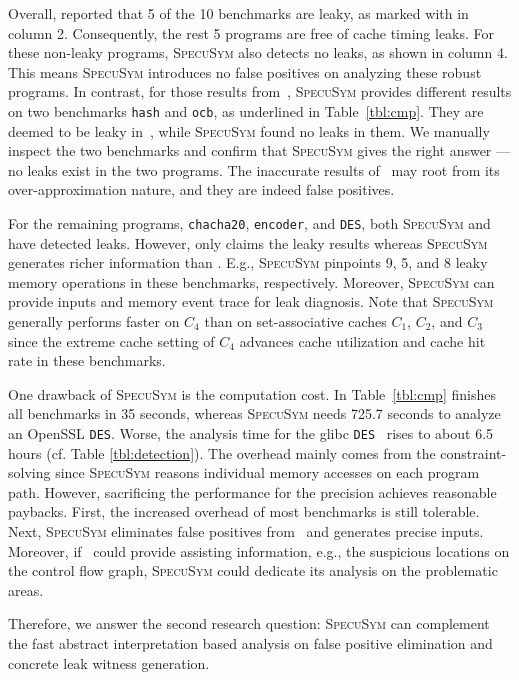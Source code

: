\documentclass[sigconf]{acmart}
\newcommand{\SpecuSym}{\textsc{SpecuSym} }
\begin{document}
Overall, \cite{WuW19} reported that 5 of the 10 benchmarks are leaky, as marked 
with  in column 2. Consequently, the rest 5 programs are free of cache
timing leaks. For these non-leaky programs, \SpecuSym also detects no leaks, as 
shown in column 4. This means \SpecuSym introduces no false positives on analyzing 
these robust programs. In contrast, for those  results from~\cite{WuW19}, 
\SpecuSym provides different results on two benchmarks \texttt{hash} and \texttt{ocb}, 
as underlined in Table~\ref{tbl:cmp}. They are deemed to be leaky in~\cite{WuW19},
while \SpecuSym found no leaks in them. We manually inspect the two benchmarks and 
confirm that \SpecuSym gives the right answer --- no leaks exist in the two programs. 
The inaccurate results of~\cite{WuW19} may root from its over-approximation nature,
and they are indeed false positives.


For the remaining programs, \texttt{chacha20}, \texttt{encoder}, and \texttt{DES}, 
both \SpecuSym and~\cite{WuW19} have detected leaks. However, \cite{WuW19} only 
claims the leaky results whereas \SpecuSym generates richer information than
\cite{WuW19}. E.g., \SpecuSym pinpoints 9, 5, and 8 leaky memory operations in these 
benchmarks, respectively. Moreover, \SpecuSym can provide inputs and memory event 
trace for leak diagnosis. Note that \SpecuSym generally performs faster on $C_4$ 
than on set-associative caches $C_1$, $C_2$, and $C_3$ since the extreme cache 
setting of $C_4$ advances cache utilization and cache hit rate in these benchmarks. 


One drawback of \SpecuSym is the computation cost. In Table~\ref{tbl:cmp}
\cite{WuW19} finishes all benchmarks in 35 seconds, whereas \SpecuSym needs 
725.7 seconds to analyze an OpenSSL \texttt{DES}. Worse, the analysis time 
for the glibc \texttt{DES}~\cite{glibc} rises to about 6.5 hours (cf. Table
\ref{tbl:detection}). The overhead mainly comes from the constraint-solving 
since \SpecuSym reasons individual memory accesses on each program path. 
However, sacrificing the performance for the precision achieves reasonable 
paybacks. First, the increased overhead of most benchmarks is still tolerable.
Next, \SpecuSym eliminates false positives from~\cite{WuW19} and generates 
precise inputs. Moreover, if~\cite{WuW19} could provide assisting information, 
e.g., the suspicious locations on the control flow graph, \SpecuSym could dedicate 
its analysis on the problematic areas. 


Therefore, we answer the second research question: \SpecuSym can complement the 
fast abstract interpretation based analysis on false positive elimination and 
concrete leak witness generation.
\end{document}
